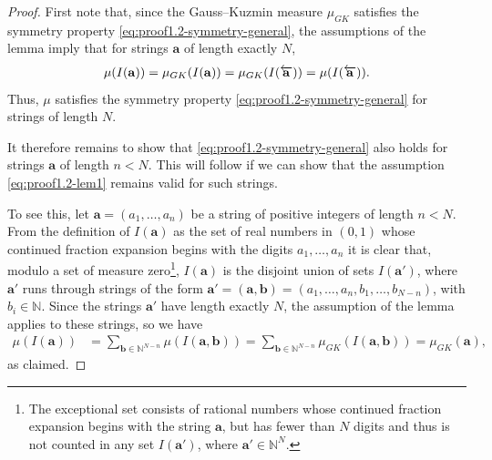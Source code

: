 \documentclass[10pt]{article}
\theoremstyle{definition}
\numberwithin{equation}{section}
\numberwithin{lemma}{section}
\newcommand{\NN}{\mathbb{N}}
\newcommand{\bfa}{\mathbf{a}}
\newcommand{\bfb}{\mathbf{b}}
\newcommand{\bfar}{\overleftarrow{\bfa}}
\begin{document}
\begin{proof}
First note that, since the Gauss--Kuzmin measure $\mu_{GK}$ satisfies the
symmetry property \eqref{eq:proof1.2-symmetry-general},
the assumptions of the lemma imply that 
for strings $\bfa$ of length exactly $N$, 
\begin{equation}
\notag
\mu(I(\bfa)) =\mu_{GK}(I(\bfa)) =\mu_{GK}(I(\bfar))= \mu(I(\bfar)).
\end{equation}
Thus, $\mu$ satisfies the symmetry property
\eqref{eq:proof1.2-symmetry-general} for strings of length $N$.

It therefore remains to show that \eqref{eq:proof1.2-symmetry-general}
also holds for strings  $\bfa$ of length $n<N$. This will follow if we
can show that the assumption \eqref{eq:proof1.2-lem1} remains valid for
such strings.

To see this, let $\bfa=(a_1,\dots,a_n)$ be a string of positive integers
of length $n<N$. From the definition of $I(\bfa)$ as the set of real
numbers in $(0,1)$ whose continued fraction expansion begins with the
digits $a_1,\dots,a_n$ it is clear that, modulo a set of measure
zero\footnote{The exceptional set consists of rational numbers whose
continued fraction expansion begins with the string $\bfa$, but has
fewer than $N$ digits and thus is not counted in any set 
$I(\bfa')$, where $\bfa'\in\NN^N$.}, 
$I(\bfa)$ is the disjoint 
union of sets 
$I(\bfa')$, where $\bfa'$ runs through strings of the form
$\bfa'=(\bfa,\bfb)=(a_1,\dots,a_n,b_1,\dots,b_{N-n})$, with $b_i\in\NN$.
Since the strings $\bfa'$ have length exactly $N$, 
the assumption of the lemma applies to these strings, so we have 
\begin{align*}
\mu(I(\bfa))
&= \sum_{\bfb\in\NN^{N-n}} \mu(I(\bfa,\bfb))
= \sum_{\bfb\in\NN^{N-n}} \mu_{GK}(I(\bfa,\bfb))=\mu_{GK}(\bfa), 
\end{align*}
as claimed. 
\end{proof}
\end{document}
